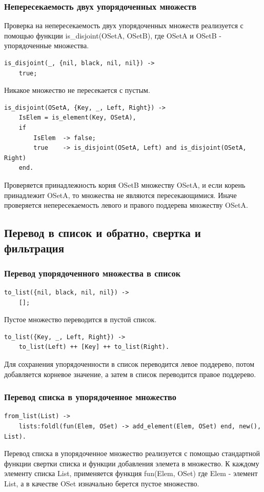 		\subsubsection{Непересекаемость двух упорядоченных множеств}
			Проверка на непересекаемость двух упорядоченных множеств реализуется с помощью функции
			is\_disjoint(OSetA, OSetB), где OSetA и OSetB - упорядоченные множества.
			\begin{lstlisting}
is_disjoint(_, {nil, black, nil, nil}) ->
	true;	
			\end{lstlisting}
			Никакое множество не пересекается с пустым.
			\begin{lstlisting}
is_disjoint(OSetA, {Key, _, Left, Right}) ->
	IsElem = is_element(Key, OSetA),
	if
		IsElem	-> false;
		true	-> is_disjoint(OSetA, Left) and is_disjoint(OSetA, Right)
	end.
			\end{lstlisting}
			Проверяется принадлежность корня OSetB множеству OSetA, и если корень
			принадлежит OSetA, то множества не являются пересекающимися. Иначе
			проверяется непересекаемость левого и правого поддерева множеству OSetA.
		
		
	\subsection{Перевод в список и обратно, свертка и фильтрация}
		\subsubsection{Перевод упорядоченного множества в список}
			\begin{lstlisting}
to_list({nil, black, nil, nil}) ->
	[];
			\end{lstlisting}
			Пустое множество переводится в пустой список.
			\begin{lstlisting}
to_list({Key, _, Left, Right}) ->
	to_list(Left) ++ [Key] ++ to_list(Right).
			\end{lstlisting}
			Для сохранения упорядоченности в список переводится левое поддерево, потом 
			добавляется корневое значение, а затем в список переводится правое поддерево.
			
		\subsubsection{Перевод списка в упорядоченное множество}
			\begin{lstlisting}
from_list(List) ->
	lists:foldl(fun(Elem, OSet) -> add_element(Elem, OSet) end, new(), List).
			\end{lstlisting}			
			Перевод списка в упорядоченное множество реализуется с помощью стандартной 
			функции свертки списка и функции добавления элемета в множество. К каждому 
			элементу списка List, применяется функция fun(Elem, OSet) где Elem - элемент
			List, а в качестве OSet изначально берется пустое множество.
			
